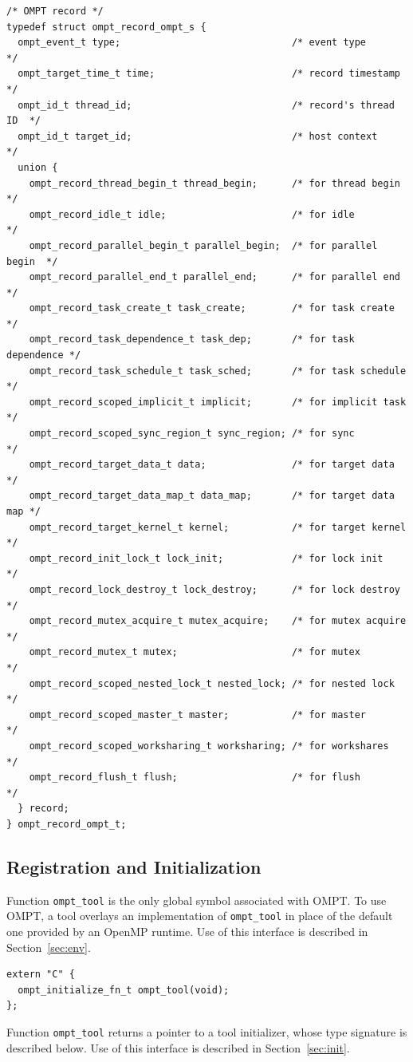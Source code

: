 \documentclass{article}
\begin{document}
\begin{verbatim}
/* OMPT record */
typedef struct ompt_record_ompt_s {
  ompt_event_t type;                              /* event type          */
  ompt_target_time_t time;                        /* record timestamp    */
  ompt_id_t thread_id;                            /* record's thread ID  */
  ompt_id_t target_id;                            /* host context        */
  union {
    ompt_record_thread_begin_t thread_begin;      /* for thread begin    */
    ompt_record_idle_t idle;                      /* for idle            */
    ompt_record_parallel_begin_t parallel_begin;  /* for parallel begin  */
    ompt_record_parallel_end_t parallel_end;      /* for parallel end    */
    ompt_record_task_create_t task_create;        /* for task create     */
    ompt_record_task_dependence_t task_dep;       /* for task dependence */
    ompt_record_task_schedule_t task_sched;       /* for task schedule   */
    ompt_record_scoped_implicit_t implicit;       /* for implicit task   */
    ompt_record_scoped_sync_region_t sync_region; /* for sync            */
    ompt_record_target_data_t data;               /* for target data     */
    ompt_record_target_data_map_t data_map;       /* for target data map */
    ompt_record_target_kernel_t kernel;           /* for target kernel   */
    ompt_record_init_lock_t lock_init;            /* for lock init       */
    ompt_record_lock_destroy_t lock_destroy;      /* for lock destroy    */
    ompt_record_mutex_acquire_t mutex_acquire;    /* for mutex acquire   */
    ompt_record_mutex_t mutex;                    /* for mutex           */
    ompt_record_scoped_nested_lock_t nested_lock; /* for nested lock     */
    ompt_record_scoped_master_t master;           /* for master          */
    ompt_record_scoped_worksharing_t worksharing; /* for workshares      */
    ompt_record_flush_t flush;                    /* for flush           */
  } record;
} ompt_record_ompt_t;
\end{verbatim}

\clearpage
\subsection{Registration and Initialization} 
\label{sec:app:init}

\noindent
Function \verb|ompt_tool| is the only global symbol associated with OMPT. To use OMPT, a tool overlays an implementation of \verb|ompt_tool| in place of the default one provided by an OpenMP runtime. Use of this interface is described in Section~\ref{sec:env}.
\begin{verbatim}
extern "C" {
  ompt_initialize_fn_t ompt_tool(void);
};
\end{verbatim}
Function \verb|ompt_tool| returns a pointer to a tool initializer, whose type signature is described below. Use of this interface is described in Section~\ref{sec:init}.
\end{document}
